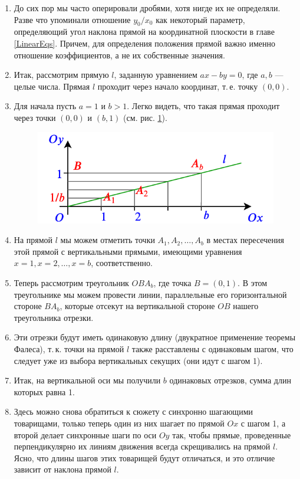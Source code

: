 \begin{enumerate}
\item До сих пор мы часто оперировали дробями, хотя нигде их не определяли. Разве что упоминали отношение $y_0/x_0$ как некоторый параметр, определяющий угол наклона прямой на координатной плоскости в главе \ref{LinearEqs}. Причем, для определения положения прямой важно именно отношение коэффициентов, а не их собственные значения.
\item Итак, рассмотрим прямую $l$, заданную уравнением $ax-by=0$, где $a,b$ --- целые числа. Прямая $l$ проходит через начало координат, т.\,е. точку $(0,0)$.
\item Для начала пусть $a=1$ и $b>1$. Легко видеть, что такая прямая проходит через точки $(0,0)$ и $(b,1)$ (см. рис. \ref{section}).
\begin{figure}[hbt!]
\begin{center}
\includegraphics[scale=0.5]{section.png}
\end{center}
\caption{}\label{section}
\end{figure}
\item На прямой $l$ мы можем отметить точки $A_1, A_2, \dots, A_b$ в местах пересечения этой прямой с вертикальными прямыми, имеющими уравнения $x=1, x=2, \dots, x=b$, соответственно.
\item Теперь рассмотрим треугольник $OBA_b$, где точка $B=(0,1)$. В этом треугольнике мы можем провести линии, параллельные его горизонтальной стороне $BA_b$, которые отсекут на вертикальной стороне $OB$ нашего треугольника отрезки.
\item Эти отрезки будут иметь одинаковую длину (двукратное применение теоремы Фалеса), т.\,к. точки на прямой $l$ также расставлены с одинаковым шагом, что следует уже из выбора вертикальных секущих (они идут с шагом 1).
\item Итак, на вертикальной оси мы получили $b$ одинаковых отрезков, сумма длин которых равна 1.
\item Здесь можно снова обратиться к сюжету с синхронно шагающими товарищами, только теперь один из них шагает по прямой $Ox$ с шагом 1, а второй делает синхронные шаги по оси $Oy$ так, чтобы прямые, проведенные перпендикулярно их линиям движения всегда скрещивались на прямой $l$. Ясно, что длины шагов этих товарищей будут отличаться, и это отличие зависит от наклона прямой $l$.

\end{enumerate}
